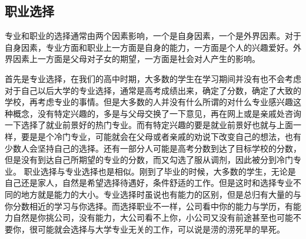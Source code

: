 \subsection{职业选择}

专业和职业的选择通常由两个因素影响，一个是自身因素，一个是外界因素。对于自身因素，专业方面和职业上一方面是自身的能力，一方面是个人的兴趣爱好。外界因素上一方面是父母对子女的期望，一方面是社会对人产生的影响。

首先是专业选择，在我们的高中时期，大多数的学生在学习期间并没有也不会考虑对于自己以后大学的专业选择，通常是高考成绩出来，确定了分数，确定了大致的学校，再考虑专业的事情。但是大多数的人并没有什么所谓的对什么专业感兴趣这种概念，没有特定兴趣的，多是与父母交换了一下意见，再在网上或是亲戚处咨询一下选择了就业前景好的热门专业。而有特定兴趣的要是就业前景好也就与上面一样，要是是个冷门专业，可能就会在父母或者亲戚的劝说下改变自己的想法，也有少数人会坚持自己的选择。还有一部分人可能是高考分数到达了目标学校的分数，但是没有到达自己所期望的专业的分数，而又勾选了服从调剂，因此被分到冷门专业。        职业选择与专业选择也是相似。刚到了毕业的时候，大多数的学生，无论是自己还是家人，自然是希望选择待遇好，条件舒适的工作。但是这时和选择专业不同的地方就是能力的大小。专业选择时虽说也有能力的区别，但是总归有大量的与你分数相近的学习与你选择。而选择职业不一样，公司看中你的能力与学历，有能力自然是你挑公司，没有能力，大公司看不上你，小公司又没有前途甚至也可能不要你，很可能就会选择与大学专业无关的工作，可以说是涝的涝死旱的旱死。